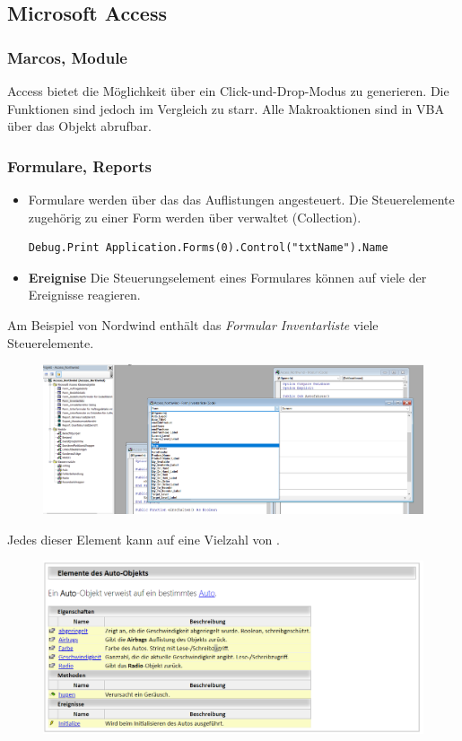 \subsection{Microsoft Access}
\subsubsection{Marcos, Module}
Access bietet die Möglichkeit  über ein Click-und-Drop-Modus zu generieren. Die Funktionen sind jedoch im Vergleich zu  starr. Alle Makroaktionen sind in \gls{VBA} über das  Objekt abrufbar.
\subsubsection{Formulare, Reports}
\begin{itemize}
\item Formulare werden über das das Auflistungen  angesteuert. Die Steuerelemente zugehörig zu einer Form werden über  verwaltet (Collection). 
\begin{lstlisting}[style=VBA]
Debug.Print Application.Forms(0).Control("txtName").Name
\end{lstlisting} 
\item \textbf{Ereignise} Die Steuerungselement eines Formulares können auf viele der Ereignisse reagieren.
\end{itemize} 
Am Beispiel von Nordwind enthält das \textit{Formular Inventarliste} viele Steuerelemente. 
\begin{figure}[H]
	\centering
	\includegraphics[scale = 0.3]{attachment/chapter_2/Scc059}
	\caption{}
	\label{fig:Scc060}
\end{figure}
Jedes dieser Element kann auf eine Vielzahl von . 
\begin{figure}[H]
	\centering
	\includegraphics[scale = 0.3]{attachment/chapter_2/Scc058}
	\caption{}
	\label{fig:Scc060}
\end{figure}
